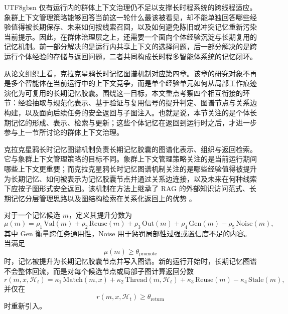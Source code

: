 \documentclass[a4paper,fleqn]{cas-sc}
\begin{document}
\begin{CJK*}{UTF8}{gbsn}
仅有运行内的群体上下文治理仍不足以支撑长时程系统的跨线程适应。象群上下文管理策略能够回答当前这一轮什么最该被看见，却不能单独回答哪些经验值得被长期保存、未来如何按线索召回，以及如何避免陈旧或冲突记忆重新污染当前提示。因此，在群体治理层之上，还需要一个面向个体经验沉淀与长期复用的记忆机制。前一部分解决的是运行内共享上下文的选择问题，后一部分解决的是跨运行个体经验的存储与返回问题，二者共同构成长时程多智能体系统的记忆闭环。

从论文组织上看，克拉克星鸦长时记忆图谱机制对应第四章。该章的研究对象不再是多个智能体在当前运行中的上下文竞争，而是单个经验单元如何从局部工作痕迹演化为可复用的长期记忆胶囊。围绕这一目标，本文重点考察四个相互衔接的环节：经验抽取与规范化表示、基于验证与复用信号的提升判定、图谱节点与关系边构建，以及面向后续任务的安全返回与子图注入。也就是说，本节关注的是个体长期记忆的形成、表示、检索与更新；这些个体记忆在返回到运行时之后，才进一步参与上一节所讨论的群体上下文治理。

克拉克星鸦长时记忆图谱机制负责长期记忆胶囊的图谱化表示、组织与返回检索。它与象群上下文管理策略的目标不同。象群上下文管理策略关注的是当前运行期间哪些上下文更重要；而克拉克星鸦长时记忆图谱机制关注的是哪些经验值得被提升为长期记忆、如何被表示为记忆胶囊节点并通过关系边连接，以及未来在何种线索下应按子图形式安全返回。该机制在方法上继承了 RAG 的外部知识访问范式、长期记忆分层管理思路以及图结构检索在关系化返回上的优势 \citep{lewis2020rag,park2023generative,packer2023memgpt,zhong2023memorybank,edge2024graphrag,gutierrez2025ragtomemory}。

对于一个记忆候选 $m$，定义其提升分数为
\begin{equation}
\mu(m) = \rho_1 \, \mathrm{Val}(m) + \rho_2 \, \mathrm{Reuse}(m) + \rho_3 \, \mathrm{Out}(m) + \rho_4 \, \mathrm{Gen}(m) - \rho_5 \, \mathrm{Noise}(m),
\end{equation}
其中 $\mathrm{Gen}$ 衡量跨任务通用性，$\mathrm{Noise}$ 用于惩罚局部性过强或置信度不足的内容。当满足
\begin{equation}
\mu(m) \geq \theta_{\text{promote}}
\end{equation}
时，记忆被提升为长期记忆胶囊节点并写入图谱。新的运行开始时，长期记忆图谱不会整体回流，而是对每个候选节点或局部子图计算返回分数
\begin{equation}
r(m, x, \mathcal{H}_t) = \kappa_1 \, \mathrm{Match}(m, x) + \kappa_2 \, \mathrm{Thread}(m, \mathcal{H}_t) + \kappa_3 \, \mathrm{Reuse}(m) - \kappa_4 \, \mathrm{Stale}(m),
\end{equation}
并仅在
\begin{equation}
r(m, x, \mathcal{H}_t) \geq \theta_{\text{return}}
\end{equation}
时重新引入。


\end{CJK*}
\end{document}
